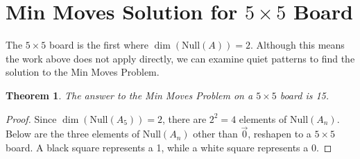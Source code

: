\documentclass[a4paper]{article}
\newtheorem{theorem}{Theorem}
\begin{document}
	\section{Min Moves Solution for $5 \times 5$ Board}
	The $5 \times 5$ board is the first where $\dim(\text{Null}(A)) = 2$.
	Although this means the work above does not apply directly, we can examine quiet patterns to find the solution to the Min Moves Problem.
	\begin{theorem}\label{min-moves-problem-5x5}
		The answer to the Min Moves Problem on a $5 \times 5$ board is 15.
	\end{theorem}
	\begin{proof}
		Since $\dim(\text{Null}(A_5)) = 2$, there are $2^2 = 4$ elements of $\text{Null}(A_n)$.
		Below are the three elements of $\text{Null}(A_n)$ other than $\vec{0}$, reshapen to a $5 \times 5$ board.
		A black square represents a 1, while a white square represents a 0.
		

\end{proof}
\end{document}
